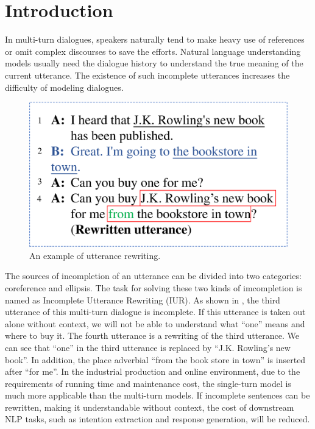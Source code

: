 \section{Introduction}

In multi-turn dialogues, 
speakers naturally tend to 
make heavy use of references or omit complex discourses to save the efforts.
Natural language understanding models usually
need the dialogue history to understand the true meaning 
of the current utterance.
The existence of such incomplete utterances increases the difficulty of modeling dialogues.

\begin{figure}[th]
        \centering
        \includegraphics[width=0.8\columnwidth]{rewrite-example.eps}
        \caption{An example of utterance rewriting.}
        \label{fig:rewrite-example}
\end{figure}

The sources of incompletion of an utterance can be divided into two categories: coreference and ellipsis. 
The task for solving these two kinds of imcompletion is named as Incomplete Utterance Rewriting (IUR). 
As shown in , the third utterance of this multi-turn dialogue is incomplete. If this utterance is taken out alone without context, 
we will not be able to 
understand what ``one'' means and where to buy it. The fourth utterance is a rewriting of the third utterance. We can see that ``one'' in the third utterance is replaced by ``J.K. Rowling's new book''. In addition, the place adverbial ``from the book store in town'' is inserted after ``for me''. %
In the industrial production and online environment, due to the requirements of running time and maintenance cost, the single-turn model is much more 
applicable than the multi-turn models.
If incomplete sentences can be rewritten, 
making it understandable without context, the cost of downstream NLP tasks, such as intention extraction and response generation, will be reduced.

